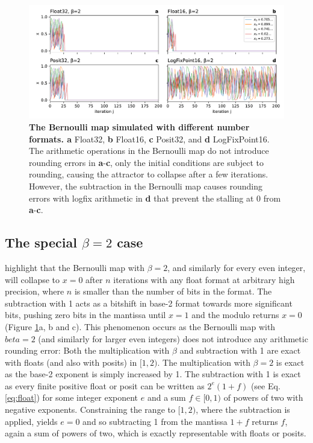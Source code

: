 \begin{figure}[tbhp]
	\includegraphics[width=1\textwidth]{Figures/orbits/beta2.pdf}
	\caption{\textbf{The Bernoulli map simulated with different number formats. a}
	Float32, \textbf{b} Float16, \textbf{c} Posit32, and \textbf{d} LogFixPoint16. The arithmetic operations in the
	Bernoulli map do not introduce rounding errors in \textbf{a}-\textbf{c}, only the initial conditions are subject
	to rounding, causing the attractor to collapse after a few iterations. However, the subtraction in the Bernoulli
	map causes rounding errors with logfix arithmetic in \textbf{d} that prevent the stalling at 0 from \textbf{a}-\textbf{c}.}
	\label{fig:orbits_beta2}
\end{figure}

\subsection{The special $\beta = 2$ case}
\label{sec:orbits_beta2}

\cite{Boghosian2019} highlight that the Bernoulli map with $\beta = 2$, and similarly for every even integer, will collapse to $x=0$
after $n$ iterations with any float format at arbitrary high precision, where $n$ is smaller than the number of bits in the format.
The subtraction with 1 acts as a bitshift in base-2 format towards more significant bits, pushing zero bits in the mantissa until $x=1$
and the modulo returns $x = 0$ (Figure \ref{fig:orbits_beta2}a, b and c). This phenomenon occurs
as the Bernoulli map with $beta=2$ (and similarly for larger even integers) does not introduce any arithmetic rounding error: Both the
multiplication with $\beta$ and subtraction with 1 are exact with floats (and also with posits) in $[1,2)$. The multiplication with $\beta=2$
is exact as the base-2 exponent is simply increased by 1. The subtraction with 1 is exact as every finite positive float
or posit can be written as $2^e(1+f)$ (see Eq. \ref{eq:float}) for some integer exponent $e$ and a sum $f \in [0,1)$ of powers of two
with negative exponents. Constraining the range to $[1,2)$, where the subtraction is applied, yields $e=0$ and so subtracting 1 from 
the mantissa $1+f$ returns $f$, again a sum of powers of two, which is exactly representable with floats or posits.

